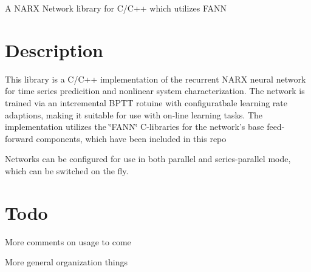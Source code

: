 A N\-A\-R\-X Network library for C/\-C++ which utilizes F\-A\-N\-N

\section*{Description}

This library is a C/\-C++ implementation of the recurrent N\-A\-R\-X neural network for time series predicition and nonlinear system characterization. The network is trained via an intcremental B\-P\-T\-T rotuine with configuratbale learning rate adaptions, making it suitable for use with on-\/line learning tasks. The implementation utilizes the \char`\"{}\-F\-A\-N\-N\char`\"{} C-\/libraries for the network's base feed-\/forward components, which have been included in this repo

Networks can be configured for use in both parallel and series-\/parallel mode, which can be switched on the fly.

\section*{Todo}


\begin{DoxyItemize}
\item More comments on usage to come
\item More general organization things 
\end{DoxyItemize}